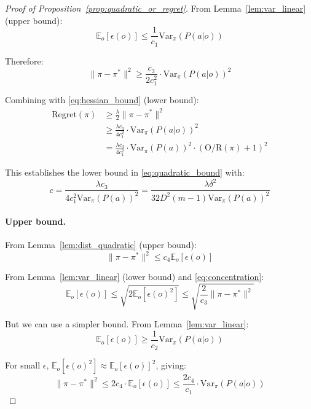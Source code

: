 \begin{proof}[Proof of Proposition~\ref{prop:quadratic_or_regret}]
From Lemma~\ref{lem:var_linear} (upper bound):
\begin{equation}
    \mathbb{E}_o[\epsilon(o)] \le \frac{1}{c_1} \text{Var}_{\pi}(P(a|o))
\end{equation}

Therefore:
\begin{equation}
    \|\pi - \pi^*\|^2 \ge \frac{c_3}{2c_1^2} \cdot \text{Var}_{\pi}(P(a|o))^2
\end{equation}

Combining with \eqref{eq:hessian_bound} (lower bound):
\begin{align}
    \text{Regret}(\pi) &\ge \frac{\lambda}{2} \|\pi - \pi^*\|^2 \\
    &\ge \frac{\lambda c_3}{4c_1^2} \cdot \text{Var}_{\pi}(P(a|o))^2 \\
    &= \frac{\lambda c_3}{4c_1^2} \cdot \text{Var}_{\pi}(P(a))^2 \cdot (\text{O/R}(\pi) + 1)^2
\end{align}

This establishes the lower bound in \eqref{eq:quadratic_bound} with:
\begin{equation}
    c = \frac{\lambda c_3}{4c_1^2 \text{Var}_{\pi}(P(a))^2} = \frac{\lambda \delta^2}{32 D^2 (m-1) \text{Var}_{\pi}(P(a))^2}
    \label{eq:constant_c}
\end{equation}

\paragraph{Upper bound.} From Lemma~\ref{lem:dist_quadratic} (upper bound):
\begin{equation}
    \|\pi - \pi^*\|^2 \le c_4 \mathbb{E}_o[\epsilon(o)]
\end{equation}

From Lemma~\ref{lem:var_linear} (lower bound) and \eqref{eq:concentration}:
\begin{equation}
    \mathbb{E}_o[\epsilon(o)] \le \sqrt{2 \mathbb{E}_o[\epsilon(o)^2]} \le \sqrt{\frac{2}{c_3} \|\pi - \pi^*\|^2}
\end{equation}

But we can use a simpler bound. From Lemma~\ref{lem:var_linear}:
\begin{equation}
    \mathbb{E}_o[\epsilon(o)] \ge \frac{1}{c_2} \text{Var}_{\pi}(P(a|o))
\end{equation}

For small $\epsilon$, $\mathbb{E}_o[\epsilon(o)^2] \approx \mathbb{E}_o[\epsilon(o)]^2$, giving:
\begin{equation}
    \|\pi - \pi^*\|^2 \le 2c_4 \cdot \mathbb{E}_o[\epsilon(o)] \le \frac{2c_4}{c_1} \cdot \text{Var}_{\pi}(P(a|o))
\end{equation}


\end{proof}
